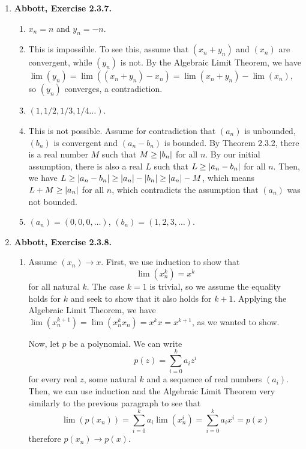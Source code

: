 \documentclass{article}
\DeclarePairedDelimiter\abs{\lvert}{\rvert}
\newcommand{\exc}[2][Abbott]{\item \textbf{#1, Exercise #2.}}
\begin{document}
\begin{enumerate}
	\exc{2.3.7}
	\begin{enumerate}
		\item $x_n = n$ and $y_n = -n$.
		      		      		                  
		\item This is impossible. To see this, assume that $(x_n+y_n)$ and $(x_n)$ are convergent, while $(y_n)$ is not. By the Algebraic Limit Theorem, we have $\lim(y_n)=\lim((x_n+y_n)-x_n) = \lim(x_n+y_n)-\lim(x_n)$, so $(y_n)$ converges, a contradiction.
		      		      		                  
		\item $(1, 1/2, 1/3, 1/4 \dots)$.
		      		      		                  
		\item This is not possible. Assume for contradiction that $(a_n)$ is unbounded, $(b_n)$ is convergent and $(a_n-b_n)$ is bounded. By Theorem 2.3.2, there is a real number $M$ such that $M \geq \abs*{b_n}$ for all $n$. By our initial assumption, there is also a real $L$ such that $L \geq \abs*{a_n-b_n}$ for all $n$. Then, we have $L \geq \abs*{a_n-b_n} \geq \abs*{a_n} - \abs*{b_n} \geq \abs*{a_n} - M$, which means $L+M \geq \abs*{a_n}$ for all $n$, which contradicts the assumption that $(a_n)$ was not bounded.
		      		      		                  
		\item $(a_n) = (0,0,0, \dots)$, $(b_n) = (1,2,3, \dots)$.
	\end{enumerate}
			        
	\exc{2.3.8}
			    
	\begin{enumerate}
		\item Assume $(x_n) \rightarrow x$. First, we use induction to show that \begin{equation*}
		      \lim (x_n^k) = x ^ k
		\end{equation*}
		for all natural $k$. The case $k = 1$ is trivial, so we assume the equality holds for $k$ and seek to show that it also holds for $k+1$. Applying the Algebraic Limit Theorem, we have $\lim(x_n^{k+1}) = \lim(x_n^k x_n) = x^k x = x^{k+1}$, as we wanted to show.
						            
		Now, let $p$ be a polynomial. We can write \begin{equation*}
		p(z) = \sum\limits_{i=0}^k a_i z^i
		\end{equation*}
		for every real $z$, some natural $k$ and a sequence of real numbers $(a_i)$. Then, we can use induction and the Algebraic Limit Theorem very similarly to the previous paragraph to see that \begin{equation*}
		\lim (p(x_n)) = \sum\limits_{i=0}^k a_i \lim(x_n^i) =\sum\limits_{i=0}^k a_i x^i = p(x)
		\end{equation*}
		therefore $p(x_n) \rightarrow p(x)$.
						            

\end{enumerate}
\end{enumerate}
\end{document}
